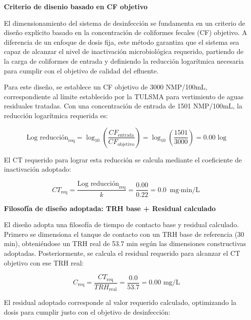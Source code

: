 \documentclass[12pt,a4paper]{article}
\begin{document}
\textbf{Criterio de disenio basado en CF objetivo}

El dimensionamiento del sistema de desinfección se fundamenta en un criterio de diseño explícito basado en la concentración de coliformes fecales (CF) objetivo. A diferencia de un enfoque de dosis fija, este método garantiza que el sistema sea capaz de alcanzar el nivel de inactivación microbiológica requerido, partiendo de la carga de coliformes de entrada y definiendo la reducción logarítmica necesaria para cumplir con el objetivo de calidad del efluente.

Para este diseño, se establece un CF objetivo de 3000 NMP/100mL, correspondiente al límite establecido por la TULSMA para vertimiento de aguas residuales tratadas. Con una concentración de entrada de 1501 NMP/100mL, la reducción logarítmica requerida es:

\begin{equation}
\text{Log reducción}_{\text{req}} = \log_{10}\left(\frac{CF_{\text{entrada}}}{CF_{\text{objetivo}}}\right) = \log_{10}\left(\frac{1501}{3000}\right) = 0.00 \text{ log}
\end{equation}

El CT requerido para lograr esta reducción se calcula mediante el coeficiente de inactivación adoptado:

\begin{equation}
CT_{\text{req}} = \frac{\text{Log reducción}_{\text{req}}}{k} = \frac{0.00}{0.22} = 0.0 \text{ mg$\cdot$min/L}
\end{equation}

\textbf{Filosofía de diseño adoptada: TRH base + Residual calculado}

El diseño adopta una filosofía de tiempo de contacto base y residual calculado. Primero se dimensiona el tanque de contacto con un TRH base de referencia (30 min), obteniéndose un TRH real de 53.7 min según las dimensiones constructivas adoptadas. Posteriormente, se calcula el residual requerido para alcanzar el CT objetivo con ese TRH real:

\begin{equation}
C_{\text{req}} = \frac{CT_{\text{req}}}{TRH_{\text{real}}} = \frac{0.0}{53.7} = 0.00 \text{ mg/L}
\end{equation}

El residual adoptado corresponde al valor requerido calculado, optimizando la dosis para cumplir justo con el objetivo de desinfección:
\end{document}
